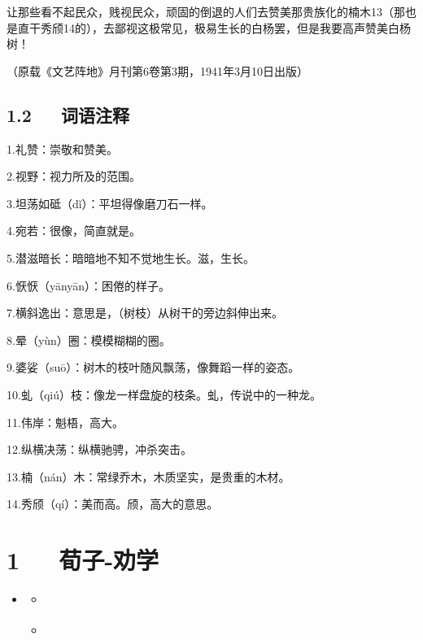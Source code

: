 \documentclass[letterpaper,12pt,english]{sphinxmanual}
\begin{document}
让那些看不起民众，贱视民众，顽固的倒退的人们去赞美那贵族化的楠木13（那也是直干秀颀14的），去鄙视这极常见，极易生长的白杨罢，但是我要高声赞美白杨树！

（原载《文艺阵地》月刊第6卷第3期，1941年3月10日出版）


\section{1.2   词语注释}
\label{\detokenize{p01_u6563_u6587/_u8305_u76fe-_u767d_u6768_u793c_u8d5e:id4}}
1.礼赞：崇敬和赞美。

2.视野：视力所及的范围。

3.坦荡如砥（dǐ）：平坦得像磨刀石一样。

4.宛若：很像，简直就是。

5.潜滋暗长：暗暗地不知不觉地生长。滋，生长。

6.恹恹（yānyān）：困倦的样子。

7.横斜逸出：意思是，（树枝）从树干的旁边斜伸出来。

8.晕（yùn）圈：模模糊糊的圈。

9.婆娑（suō）：树木的枝叶随风飘荡，像舞蹈一样的姿态。

10.虬（qiú）枝：像龙一样盘旋的枝条。虬，传说中的一种龙。

11.伟岸：魁梧，高大。

12.纵横决荡：纵横驰骋，冲杀突击。

13.楠（nán）木：常绿乔木，木质坚实，是贵重的木材。

14.秀颀（qí）：美而高。颀，高大的意思。


\chapter{1   荀子-劝学}
\label{\detokenize{p01_u6563_u6587/_u8340_u5b50-_u529d_u5b66:id1}}\label{\detokenize{p01_u6563_u6587/_u8340_u5b50-_u529d_u5b66::doc}}
\begin{sphinxShadowBox}
\begin{itemize}
\item {} 
\label{\detokenize{p01_u6563_u6587/_u8340_u5b50-_u529d_u5b66:id5}}{\hyperref[\detokenize{p01_u6563_u6587/_u8340_u5b50-_u529d_u5b66:id1}]{}}
\begin{itemize}
\item {} 
\label{\detokenize{p01_u6563_u6587/_u8340_u5b50-_u529d_u5b66:id6}}{\hyperref[\detokenize{p01_u6563_u6587/_u8340_u5b50-_u529d_u5b66:id3}]{}}

\item {} 
\label{\detokenize{p01_u6563_u6587/_u8340_u5b50-_u529d_u5b66:id7}}{\hyperref[\detokenize{p01_u6563_u6587/_u8340_u5b50-_u529d_u5b66:id4}]{}}

\end{itemize}

\end{itemize}
\end{sphinxShadowBox}
\end{document}
